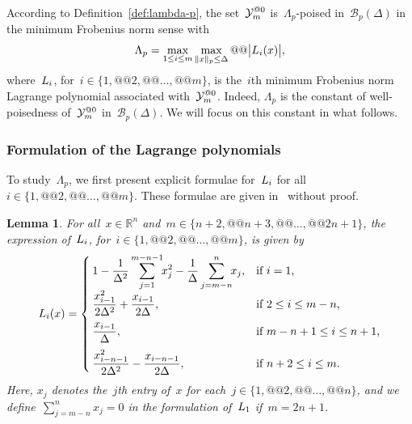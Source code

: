 \documentclass{article}
\makeatletter
\newcounter{cite}
\numberwithin{equation}{section}
\theoremstyle{definition}
\theoremstyle{plain}
\newtheorem{lemma}{Lemma}[section]
\theoremstyle{remark}
\newcommand*{\abs}[2][]{#1\lvert#2#1\rvert}
\newcommand*{\norm}[2][]{#1\lVert#2#1\rVert}
\newcommand*{\set}[2][]{#1\{#2#1\}}
\newcommand*{\R}{\mathbb{R}}
\newcommand*{\lagp}[1][]{L\ifblank{#1}{}{_{#1}}}
\newcommand*{\xpt}[1][]{\mathcal{Y}\ifblank{#1}{}{^{@#1}}}
\makeatother
\begin{document}
According to Definition~\ref{def:lambda-p}, the set~$\xpt[0]_m$ is~$\Lambda_p$-poised in~$\mathcal{B}_p(\Delta)$ in the minimum Frobenius norm sense with
\begin{equation}
    \label{eq:Lambdap}
    \Lambda_p = \max_{1 \le i \le m} \max_{\norm{x}_p \le \Delta} @@ \abs[\big]{\lagp[i](x)},
\end{equation}
where~$\lagp[i]$, for~$i \in \set{1, @@ 2, @@ \dots, @@ m}$, is the~$i$th minimum Frobenius norm Lagrange polynomial associated with~$\xpt[0]_m$.
Indeed, $\Lambda_p$ is the {constant of well-poisedness} of~$\xpt[0]_m$ in~$\mathcal{B}_p(\Delta)$.
We will focus on this constant in what follows.

\subsubsection{Formulation of the Lagrange polynomials}

To study~$\Lambda_p$, we first present explicit formulae for~$\lagp[i]$ for all~$i \in \set{1, @@ 2, @@ \dots, @@ m}$.
These formulae are given in~\cite[\S~3]{Powell_2006} without proof.

\begin{lemma}
    \label{lem:lagp}
    For all~$x \in \R^n$ and~$m \in \set{n + 2, @@ n + 3, @@ \dots,  @@ 2n + 1}$, the expression of~$\lagp[i]$, for~$i \in \set{1, @@ 2, @@ \dots, @@ m}$, is given by
    \begin{equation}
        \label{eq:lagp}
        \lagp[i](x) =
        \begin{cases}
            \displaystyle 1 - \frac{1}{\Delta^2} \sum_{j = 1}^{m - n - 1} \!\! x_j^2 - \frac{1}{\Delta} \sum_{j = m - n}^n \!\! x_j,    & \text{if~$i = 1$,}\\[2ex]
            \displaystyle \frac{x_{i - 1}^2}{2\Delta^2} + \frac{x_{i - 1}}{2\Delta},                                                    & \text{if~$2 \le i \le m - n$,}\\[2ex]
            \displaystyle \frac{x_{i - 1}}{\Delta},                                                                          & \text{if~$m - n + 1 \le i \le n + 1$,}\\[2ex]
            \displaystyle \frac{x_{i - n - 1}^2}{2\Delta^2} - \frac{x_{i -n- 1}}{2\Delta},                                    & \text{if~$n+2\le i \le m$.}
        \end{cases}
    \end{equation}
    Here, $x_j$ denotes the~$j$th entry of~$x$ for each~$j \in \set{1, @@ 2, @@ \dots, @@ n}$, and we define~$\sum_{j = m - n}^n x_j = 0$ in the formulation of~$\lagp[1]$ if~$m = 2n + 1$.
\end{lemma}
\end{document}
